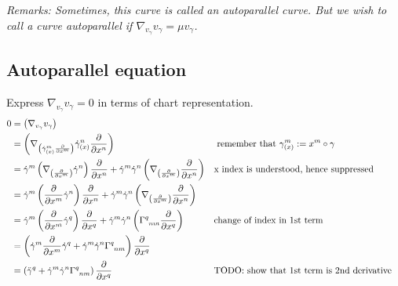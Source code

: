 \textit{Remarks: Sometimes, this curve is called an autoparallel curve. But we wish to call a curve autoparallel if $\nabla_{v_{\gamma}}v_{\gamma} = \mu v_{\gamma}$.}

\subsection{Autoparallel equation}
Express $\nabla_{v_{\gamma}} v_{\gamma} = 0$ in terms of chart representation.
\begin{align*}
0 & = \left(\nabla_{v_{\gamma}} v_{\gamma}\right) \\
& = \left(\nabla_{\left(\dot{\gamma}^m_{(x)} \cibasis{x^m}\right)} \dot{\gamma}^n_{(x)} \cibasis{x^n}\right) && \text{ remember that } \gamma^m_{(x)} := x^m \after \gamma \\
& = \dot{\gamma}^m \left(\nabla_{\left(\cibasis{x^m}\right)} \dot{\gamma}^n\right) \cibasis{x^n} + \dot{\gamma}^m \dot{\gamma}^n \left(\nabla_{\left(\cibasis{x^m}\right)} \cibasis{x^n}\right) && \text{x index is understood, hence suppressed} \\
& = \dot{\gamma}^m \left(\cibasis{x^m} \dot{\gamma}^n\right) \cibasis{x^n} + \dot{\gamma}^m \dot{\gamma}^n \left(\nabla_{\left(\cibasis{x^m}\right)} \cibasis{x^n}\right) && \text{} \\
& = \dot{\gamma}^m \left(\cibasis{x^m} \dot{\gamma}^q\right) \cibasis{x^q} + \dot{\gamma}^m \dot{\gamma}^n \left(\Gamma\indices{^{q}_{nm}} \cibasis{x^q}\right) && \text{change of index in 1st term} \\
& = \left(\dot{\gamma}^m \cibasis{x^m} \dot{\gamma}^q + \dot{\gamma}^m \dot{\gamma}^n \Gamma\indices{^{q}_{nm}}\right) \cibasis{x^q} && \text{} \\
& = \left(\ddot{\gamma}^q + \dot{\gamma}^m \dot{\gamma}^n \Gamma\indices{^{q}_{nm}}\right) \cibasis{x^q} && \text{TODO: show that 1st term is 2nd derivative}
\end{align*}


